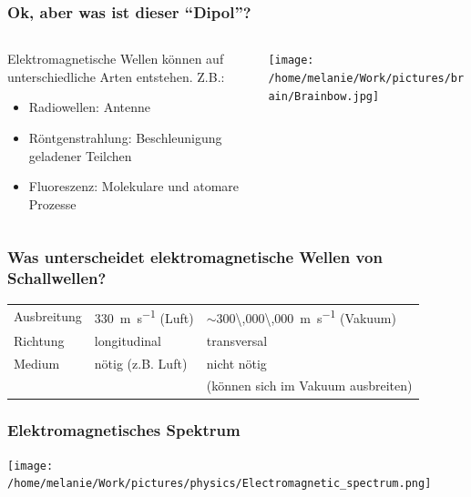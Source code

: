 \documentclass{beamer}
\begin{document}
\begin{frame}
\frametitle{Ok, aber was ist dieser ``Dipol''?}


\begin{columns}[c]
\begin{column}{5cm}
Elektromagnetische Wellen können auf unterschiedliche Arten entstehen. Z.B.:\\
\begin{itemize}
\item
Radiowellen: Antenne 
\item
Röntgenstrahlung: Beschleunigung geladener Teilchen 
\item
Fluoreszenz: Molekulare und atomare Prozesse
\end{itemize}
\end{column}


\begin{column}{5cm}
\begin{center}
\texttt{[image: /home/melanie/Work/pictures/brain/Brainbow.jpg]}
\end{center}


\end{column}

\end{columns}

\end{frame}


\begin{frame}
\frametitle{Was unterscheidet elektromagnetische Wellen von Schallwellen?}

\pause

\begin{tabular}{|l|l|l|}
\hline
        & \color{theme}{\textbf{Schallwellen}}  & \color{theme}{\textbf{Elektromagnetische Wellen}}     \\
\hline
Ausbreitung       & \SI{330}{\meter\per\second} (Luft)  &  \(\sim\)\SI{300\,000\,000}{\meter\per\second} (Vakuum)   \\
\hline
Richtung        & longitudinal  & transversal   \\
\hline
Medium          & nötig (z.B. Luft)        & nicht nötig \\ 
&                       & (können sich im Vakuum ausbreiten)       \\
\hline
\end{tabular}


\end{frame}


\begin{frame}
\frametitle{Elektromagnetisches Spektrum}

\begin{center}
\texttt{[image: /home/melanie/Work/pictures/physics/Electromagnetic\_spectrum.png]}
\end{center}

\end{frame}
\end{document}
